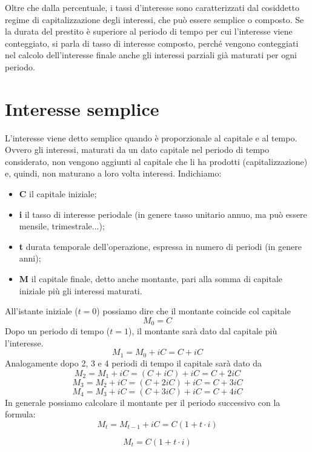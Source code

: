 Oltre che dalla percentuale, i tassi d'interesse sono caratterizzati dal 
cosiddetto regime di capitalizzazione degli interessi, che può essere semplice 
o composto. Se la durata del prestito è superiore al periodo di tempo per cui 
l'interesse viene conteggiato, si parla di tasso di interesse composto, perché 
vengono conteggiati nel calcolo dell'interesse finale anche gli interessi 
parziali già maturati per ogni periodo.

\section{Interesse semplice}
L'interesse viene detto semplice quando è proporzionale al capitale e al tempo. 
Ovvero gli interessi, maturati da un dato capitale nel periodo di tempo 
considerato, non vengono aggiunti al capitale che li ha prodotti 
(capitalizzazione) e, quindi, non maturano a loro volta interessi. Indichiamo:

\begin{itemize}
\item \textbf{C} il capitale iniziale;
\item \textbf{i} il tasso di interesse periodale (in genere tasso unitario annuo, ma 
può essere mensile, trimestrale...);
\item \textbf{t} durata temporale dell'operazione, espressa in numero di periodi (in 
genere anni);
\item \textbf{M} il capitale finale, detto anche montante, pari alla somma di capitale 
iniziale più gli interessi maturati. 
\end{itemize}

All'istante iniziale (\(t=0\)) possiamo dire che il montante coincide col 
capitale \[ M_{0}=C \]
Dopo un periodo di tempo (\(t=1\)), il montante sarà dato dal capitale più 
l'interesse. 
\[ M_{1}=M_{0} +iC = C + iC \]
Analogamente dopo 2, 3 e 4 periodi di tempo il capitale sarà dato da 
\[ M_{2}=M_{1} +iC = (C + iC) +iC = C +2iC\]
\[ M_{3}=M_{2} +iC = (C + 2iC) +iC = C +3iC\]
\[ M_{4}=M_{3} +iC = (C + 3iC) +iC = C +4iC\]
In generale possiamo calcolare il montante per il periodo successivo con la 
formula:
\[ M_{t}=M_{t-1}+iC=C(1+t\cdot i) \]
\begin{definizione}
\[ M_{t}=C(1+t\cdot i) \]
\end{definizione}

